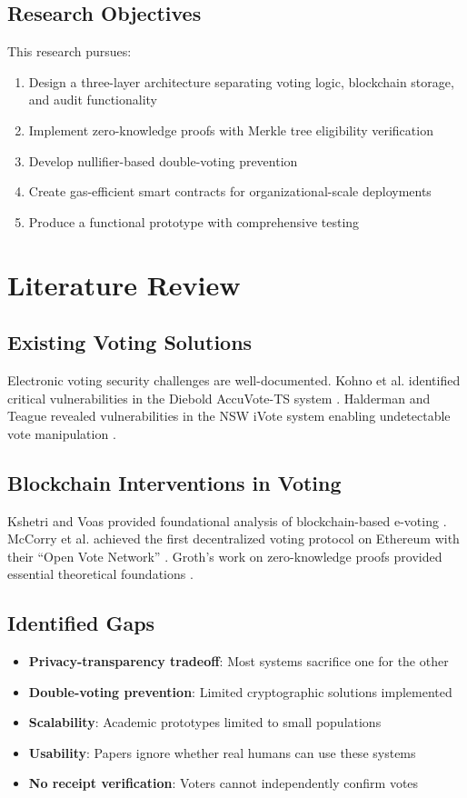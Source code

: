 \documentclass[conference]{IEEEtran}
\begin{document}
\subsection{Research Objectives}
This research pursues:
\begin{enumerate}
    \item Design a three-layer architecture separating voting logic, blockchain storage, and audit functionality
    \item Implement zero-knowledge proofs with Merkle tree eligibility verification
    \item Develop nullifier-based double-voting prevention
    \item Create gas-efficient smart contracts for organizational-scale deployments
    \item Produce a functional prototype with comprehensive testing
\end{enumerate}

\section{Literature Review}

\subsection{Existing Voting Solutions}
Electronic voting security challenges are well-documented. Kohno et al. identified critical vulnerabilities in the Diebold AccuVote-TS system \cite{dre_issues}. Halderman and Teague revealed vulnerabilities in the NSW iVote system enabling undetectable vote manipulation \cite{internet_voting}.

\subsection{Blockchain Interventions in Voting}
Kshetri and Voas provided foundational analysis of blockchain-based e-voting \cite{kshetri2018blockchain}. McCorry et al. achieved the first decentralized voting protocol on Ethereum with their ``Open Vote Network'' \cite{mccorry2017smart}. Groth's work on zero-knowledge proofs provided essential theoretical foundations \cite{zkp_voting}.

\subsection{Identified Gaps}
\begin{itemize}
    \item \textbf{Privacy-transparency tradeoff}: Most systems sacrifice one for the other
    \item \textbf{Double-voting prevention}: Limited cryptographic solutions implemented
    \item \textbf{Scalability}: Academic prototypes limited to small populations
    \item \textbf{Usability}: Papers ignore whether real humans can use these systems
    \item \textbf{No receipt verification}: Voters cannot independently confirm votes
\end{itemize}
\end{document}
